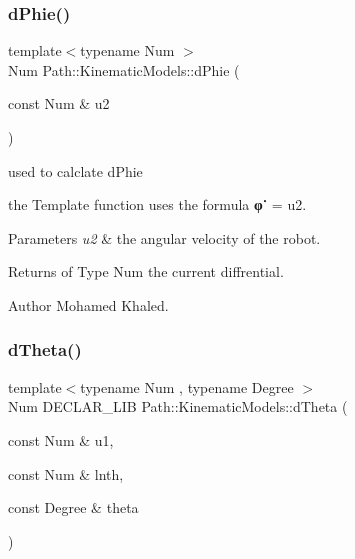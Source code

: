 \subsubsection{\texorpdfstring{d\+Phie()}{dPhie()}\hspace{0.1cm}{\footnotesize\ttfamily [2/2]}}
{\footnotesize\ttfamily template$<$typename Num $>$ \\
Num Path\+::\+Kinematic\+Models\+::d\+Phie (\begin{DoxyParamCaption}\item[{const Num \&}]{u2 }\end{DoxyParamCaption})}



used to calclate d\+Phie 

the Template function uses the formula {\bfseries φ˙} = u2. 
\begin{DoxyParams}{Parameters}
{\em u2} & the angular velocity of the robot. \\
\hline
\end{DoxyParams}
\begin{DoxyReturn}{Returns}
of Type Num the current diffrential. 
\end{DoxyReturn}
\begin{DoxyAuthor}{Author}
Mohamed Khaled. 
\end{DoxyAuthor}
\mbox{\label{namespace_path_1_1_kinematic_models_ae5c91053b1ebb8437864fcd208a45d27}} 
\subsubsection{\texorpdfstring{d\+Theta()}{dTheta()}\hspace{0.1cm}{\footnotesize\ttfamily [1/2]}}
{\footnotesize\ttfamily template$<$typename Num , typename Degree $>$ \\
Num D\+E\+C\+L\+A\+R\+\_\+\+L\+IB Path\+::\+Kinematic\+Models\+::d\+Theta (\begin{DoxyParamCaption}\item[{const Num \&}]{u1,  }\item[{const Num \&}]{lnth,  }\item[{const Degree \&}]{theta }\end{DoxyParamCaption})}



